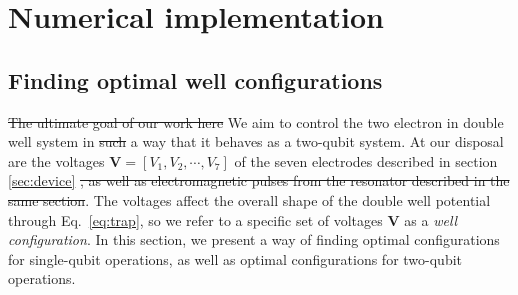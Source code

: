 \documentclass[twocolumn,superscriptaddress,unsortedaddress,
 amsmath,amssymb,
 aps,
]{revtex4-2}
\begin{document}
\section{Numerical implementation}

    \subsection{Finding optimal well configurations}
        \label{sec:opt-well-conf}
        
        \st{The ultimate goal of our work here} We aim to control the two electron in double well system in \st{such} a way that it behaves as a two-qubit system. At our disposal are the voltages $\boldsymbol{V}=[V_1,V_2,\cdots,V_7]$ of the seven electrodes described in section \ref{sec:device} \st{, as well as electromagnetic pulses from the resonator described in the same section}. The voltages affect the overall shape of the double well potential through Eq.~\eqref{eq:trap}, so we refer to a specific set of voltages $\boldsymbol{V}$ as a \textit{well configuration}. In this section, we present a way of finding optimal configurations for single-qubit operations, as well as optimal configurations for two-qubit operations.
        
\end{document}
